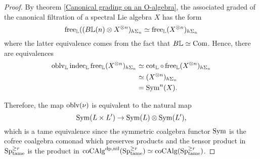 \begin{proof}
	By theorem \ref{Canonical grading on an O-algebra}, the associated graded of the canonical filtration of a spectral Lie algebra $X$ has the form 
	$$
	\operatorname{free}_{{\mathbb{L}}}((B{\mathbb{L}}(n)\otimes X^{\otimes n})_{h\Sigma_n} \simeq \operatorname{free}_{{\mathbb{L}}}(X^{\otimes n})_{h\Sigma_n}
	$$
	where the latter equivalence comes from the fact that $B{\mathbb{L}}\simeq \operatorname{Com}$. 
	Hence, there are equivalences
	\begin{align*}
	\operatorname{oblv}_{{\mathbb{L}}}\operatorname{indec}_{{\mathbb{L}}}
	\operatorname{free}_{{\mathbb{L}}}(X^{\otimes n})_{h\Sigma_n}
	&\simeq 
	\cot_{{\mathbb{L}}}\circ \operatorname{free}_{{\mathbb{L}}}(X^{\otimes n})_{h\Sigma_n}  \\	    
	&\simeq (X^{\otimes n})_{h\Sigma_n} \\
	& = \operatorname{Sym}^n(X).
	\end{align*}

	Therefore, the map $\operatorname{oblv}(\nu)$ is equivalent to the natural map
	$$
	\operatorname{Sym} (L\times L') \to \operatorname{Sym}(L) \otimes \operatorname{Sym}(L'),
	$$
	which is a tame equivalence since the symmetric coalgebra functor $\operatorname{Sym}$ is the cofree coalgebra comonad which preserves products and the tensor product in $\operatorname{Sp}^{\geq r}_{\operatorname{\operatorname{tame}}}$ is the product in $\operatorname{coCAlg}^{\operatorname{dp},\operatorname{nil}}(\operatorname{Sp}^{\geq r}_{\operatorname{\operatorname{tame}}})\simeq \operatorname{coCAlg}(\operatorname{Sp}^{\geq r}_{\operatorname{\operatorname{tame}}})$.

\end{proof}













